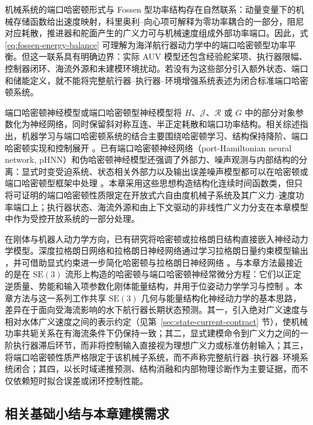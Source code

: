 \documentclass[UTF8,zihao=-4]{ctexrep}
\newcommand{\SE}{\mathrm{SE}}
\begin{document}
机械系统的端口哈密顿形式与 Fossen 型功率结构存在自然联系：动量变量下的机械存储函数给出速度映射，科里奥利--向心项可解释为零功率耦合的一部分，阻尼对应耗散，推进器和舵面产生的广义力可与机械速度组成外部功率端口。因此，式 \eqref{eq:fossen-energy-balance} 可理解为海洋航行器动力学中的端口哈密顿型功率平衡。但这一联系具有明确边界：实际 AUV 模型还包含经验舵桨项、执行器限幅、控制器闭环、海流外源和未建模环境扰动。若没有为这些部分引入额外状态、端口和储能定义，就不能将完整航行器--执行器--环境增强系统表述为闭合标准端口哈密顿系统。

端口哈密顿神经模型或端口哈密顿型神经模型将 \(H\)、\(\mathcal{J}\)、\(\mathcal R\) 或 \(G\) 中的部分对象参数化为神经网络，同时保留斜对称互连、半正定耗散和端口功率结构。相关综述指出，机器学习与端口哈密顿系统的结合主要围绕哈密顿学习、结构保持降阶、端口哈密顿实现和控制展开 \citep{cherifi2020overviewphml}。已有端口哈密顿神经网络（port-Hamiltonian neural network, pHNN）和伪哈密顿神经模型还强调了外部力、噪声观测与内部结构的分离：显式时变受迫系统、状态相关外部力以及输出误差噪声模型都可以在哈密顿或端口哈密顿型框架中处理 \citep{desai2021porthamiltonian,eidnes2023pseudohamiltonian,moradi2026phnnoutputerror}。本章采用这些思想构造结构化连续时间函数类，但只将可证明的端口哈密顿性质限定在开放式六自由度机械子系统及其广义力--速度功率端口上；执行器状态、海流外源和由上下文驱动的非线性广义力分支在本章模型中作为受控开放系统的一部分处理。

在刚体与机器人动力学方向，已有研究将哈密顿或拉格朗日结构直接嵌入神经动力学模型。深度拉格朗日网络和拉格朗日神经网络通过学习拉格朗日量约束模型输出 \citep{lutter2019deeplagrangian,cranmer2020lagrangian}，并可借助显式约束进一步简化哈密顿与拉格朗日神经网络 \citep{finzi2020constrained}。与本章方法最接近的是在 \(\SE(3)\) 流形上构造的哈密顿与端口哈密顿神经常微分方程：它们以正定逆质量、势能和输入项参数化刚体能量结构，并用于位姿动力学学习与控制 \citep{duong2021se3hamnode,duong2024liegroupphnode}。本章方法与这一系列工作共享 \(\SE(3)\) 几何与能量结构化神经动力学的基本思路，差异在于面向受海流影响的水下航行器长期状态预测。其一，引入绝对广义速度与相对水体广义速度之间的表示约定（见第~\ref{sec:state-current-contract} 节），使机械功率共轭关系在有海流条件下仍保持一致；其二，显式建模命令到广义力之间的一阶执行器滞后环节，而非将控制输入直接视为理想广义力或标准仿射输入；其三，将端口哈密顿性质严格限定于该机械子系统，而不声称完整航行器--执行器--环境系统闭合；其四，以长时域递推预测、结构消融和内部物理诊断作为主要证据，而不仅依赖短时拟合误差或闭环控制性能。

\subsection{相关基础小结与本章建模需求}
\end{document}
